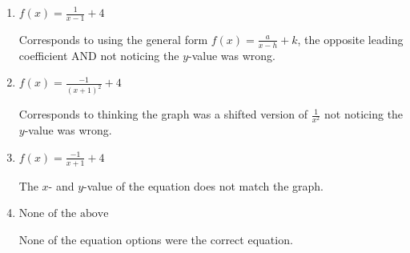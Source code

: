 \documentclass{extbook}[14pt]
\begin{document}
\begin{enumerate}
{\begin{enumerate}[label=\Alph*.]
Corresponds to thinking the graph was a shifted version of $\frac{1}{x^2}$, using the general form $f(x) = \frac{a}{x-h}+k$, the opposite leading coefficient, AND not noticing the $y$-value was wrong.
\item \( f(x) = \frac{1}{x - 1} + 4 \)

Corresponds to using the general form $f(x) = \frac{a}{x-h}+k$, the opposite leading coefficient AND not noticing the $y$-value was wrong.
\item \( f(x) = \frac{-1}{(x + 1)^2} + 4 \)

Corresponds to thinking the graph was a shifted version of $\frac{1}{x^2}$ not noticing the $y$-value was wrong.
\item \( f(x) = \frac{-1}{x + 1} + 4 \)

The $x$- and $y$-value of the equation does not match the graph.
\item \( \text{None of the above} \)

None of the equation options were the correct equation.
\end{enumerate}

}
\end{enumerate}
\end{document}
